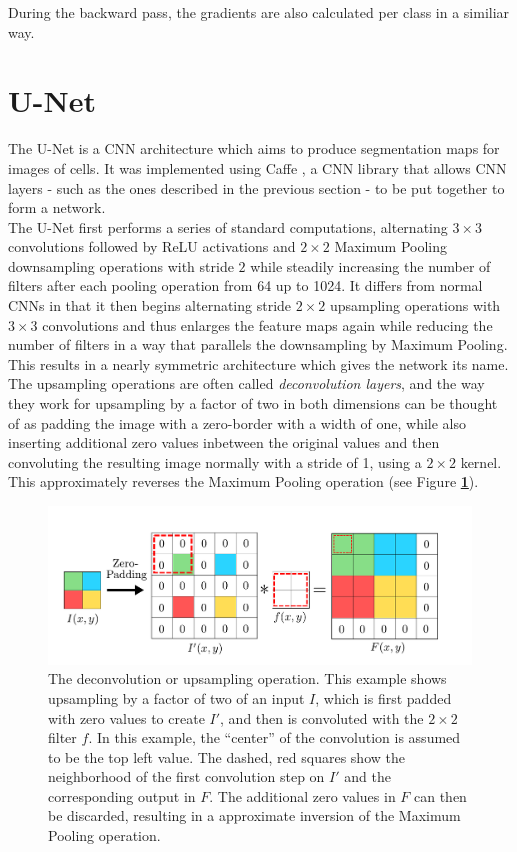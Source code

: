 During the backward pass, the gradients are also calculated per class in a similiar way.


	\section {U-Net}
\label{sec:unet}
The U-Net \cite{unet} is a CNN architecture which aims to produce segmentation maps for images of cells. It was implemented using Caffe \cite{caffe}, a CNN library that allows CNN layers - such as the ones described in the previous section - to be put together to form a network.\\

The U-Net first performs a series of standard computations, alternating $3 \times 3$ convolutions followed by ReLU activations and $2 \times 2$ Maximum Pooling downsampling operations with stride $2$ while steadily increasing the number of filters after each pooling operation from 64 up to 1024. It differs from normal CNNs in that it then begins alternating stride $2 \times 2$ upsampling operations with $3 \times 3$ convolutions and thus enlarges the feature maps again while reducing the number of filters in a way that parallels the downsampling by Maximum Pooling. This results in a nearly symmetric architecture which gives the network its name. The upsampling operations are often called \textit{deconvolution layers}, and the way they work for upsampling by a factor of two in both dimensions can be thought of as padding the image with a zero-border with a width of one, while also inserting additional zero values inbetween the original values and then convoluting the resulting image normally with a stride of 1, using a $2 \times 2$ kernel. This approximately reverses the Maximum Pooling operation (see Figure \textbf{\ref{fig:upconvolution}}). \cite[p. 14]{transposed_conv}\cite{up_conv}

\begin {figure}[!hbt]
	\begin{center}
		\includegraphics[scale=0.50]{img/fig_upconvolution}
	\end{center}
	\caption[Matrix upconvolution.]{The deconvolution or upsampling operation. This example shows upsampling by a factor of two of an input $I$, which is first padded with zero values to create $I'$, and then is convoluted with the $2 \times 2$ filter $f$. In this example, the ``center'' of the convolution is assumed to be the top left value. The dashed, red squares show the neighborhood of the first convolution step on $I'$ and the corresponding output in $F$. The additional zero values in $F$ can then be discarded, resulting in a approximate inversion of the Maximum Pooling operation. \footnotemark}
	\label{fig:upconvolution}
\end {figure}

